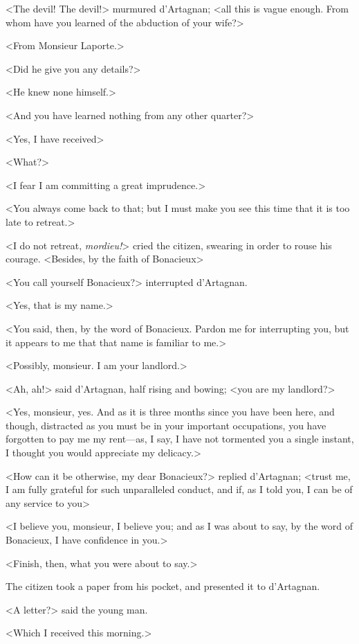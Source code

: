 <The devil! The devil!> murmured d'Artagnan; <all this is vague enough. From whom have you learned of the abduction of your wife?> 

<From Monsieur Laporte.> 

<Did he give you any details?> 

<He knew none himself.> 

<And you have learned nothing from any other quarter?> 

<Yes, I have received\longdash> 

<What?> 

<I fear I am committing a great imprudence.> 

<You always come back to that; but I must make you see this time that it is too late to retreat.> 

<I do not retreat, \textit{mordieu!}> cried the citizen, swearing in order to rouse his courage. <Besides, by the faith of Bonacieux\longdash> 

<You call yourself Bonacieux?> interrupted d'Artagnan. 

<Yes, that is my name.> 

<You said, then, by the word of Bonacieux. Pardon me for interrupting you, but it appears to me that that name is familiar to me.> 

<Possibly, monsieur. I am your landlord.> 

<Ah, ah!> said d'Artagnan, half rising and bowing; <you are my landlord?> 

<Yes, monsieur, yes. And as it is three months since you have been here, and though, distracted as you must be in your important occupations, you have forgotten to pay me my rent---as, I say, I have not tormented you a single instant, I thought you would appreciate my delicacy.> 

<How can it be otherwise, my dear Bonacieux?> replied d'Artagnan; <trust me, I am fully grateful for such unparalleled conduct, and if, as I told you, I can be of any service to you\longdash> 

<I believe you, monsieur, I believe you; and as I was about to say, by the word of Bonacieux, I have confidence in you.> 

<Finish, then, what you were about to say.> 

The citizen took a paper from his pocket, and presented it to d'Artagnan. 

<A letter?> said the young man. 

<Which I received this morning.> 

